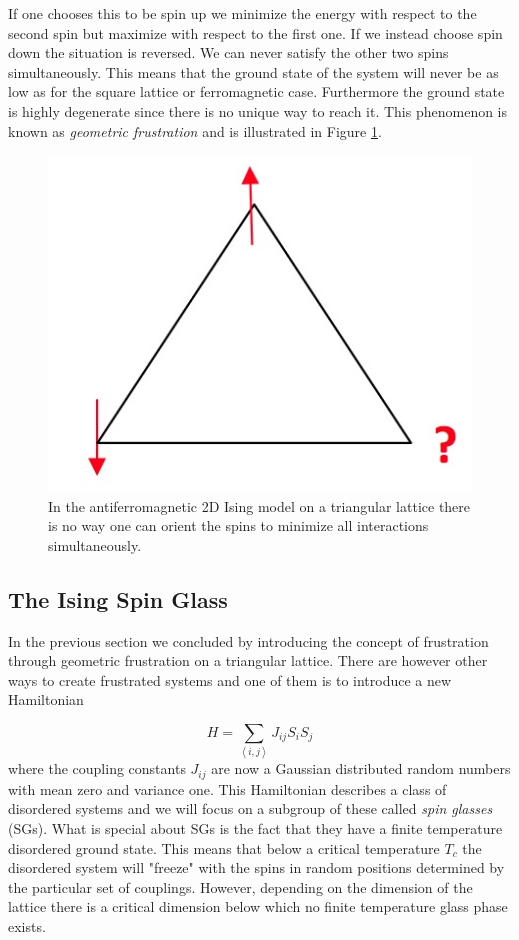 \documentclass[paper=a4, fontsize=11pt]{scrartcl} %
\numberwithin{equation}{section} %
\numberwithin{figure}{section} %
\numberwithin{table}{section} %
\begin{document}
If one chooses this to be spin up we minimize the energy with respect to the second spin but maximize with respect to the first one. If we instead choose spin down the situation is reversed. We can never satisfy the other two spins simultaneously. This means that the ground state of the system will never be as low as for the square lattice or ferromagnetic case. Furthermore the ground state is highly degenerate since there is no unique way to reach it. This phenomenon is known as \emph{geometric frustration} and is illustrated in Figure \ref{fig:frustration}.

\begin{figure}
\centering
\includegraphics[scale=0.5]{images/frustration.jpg}
\caption{In the antiferromagnetic 2D Ising model on a triangular lattice there is no way one can orient the spins to minimize all interactions simultaneously.}
\label{fig:frustration}
\end{figure}

\subsection{The Ising Spin Glass}
In the previous section we concluded by introducing the concept of frustration through geometric frustration on a triangular lattice. There are however other ways to create frustrated systems and one of them is to introduce a new Hamiltonian

\begin{equation}
H=\sum\limits_{\left\langle i,j \right\rangle} J_{ij} S_{i} S_{j}
\end{equation}
where the coupling constants $J_{ij}$ are now a Gaussian distributed random numbers with mean zero and variance one. This Hamiltonian describes a class of disordered systems and we will focus on a subgroup of these called \emph{spin glasses} (SGs). What is special about SGs is the fact that they have a finite temperature disordered ground state. This means that below a critical temperature $T_c$ the disordered system will "freeze" with the spins in random positions determined by the particular set of couplings. However, depending on the dimension of the lattice there is a critical dimension below which no finite temperature glass phase exists\cite{almeida}.
\end{document}
